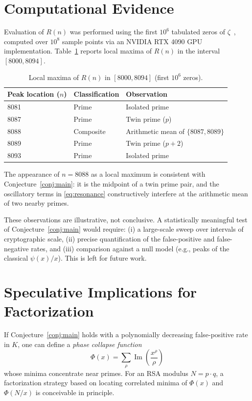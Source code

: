 \documentclass[11pt,a4paper]{article}
\begin{document}
\section{Computational Evidence}

Evaluation of $R(n)$ was performed using the first $10^6$ tabulated zeros of
$\zeta$~\cite{odlyzko}, computed over $10^8$ sample points via an NVIDIA RTX 4090
GPU implementation. Table~\ref{tab:results} reports local maxima of $R(n)$ in the
interval $[8000, 8094]$.

\begin{table}[h]
\centering
\caption{Local maxima of $R(n)$ in $[8000, 8094]$ (first $10^6$ zeros).}
\vspace{2mm}
\label{tab:results}
\begin{tabular}{lll}
\toprule
\textbf{Peak location ($n$)} & \textbf{Classification} & \textbf{Observation} \\
\midrule
8081 & Prime       & Isolated prime \\
8087 & Prime       & Twin prime ($p$) \\
8088 & Composite   & Arithmetic mean of $\{8087, 8089\}$ \\
8089 & Prime       & Twin prime ($p+2$) \\
8093 & Prime       & Isolated prime \\
\bottomrule
\end{tabular}
\end{table}

The appearance of $n=8088$ as a local maximum is consistent with
Conjecture~\ref{conj:main}: it is the midpoint of a twin prime pair, and the
oscillatory terms in \eqref{eq:resonance} constructively interfere at the
arithmetic mean of two nearby primes.

These observations are illustrative, not conclusive. A statistically meaningful
test of Conjecture~\ref{conj:main} would require:
(i) a large-scale sweep over intervals of cryptographic scale,
(ii) precise quantification of the false-positive and false-negative rates,
and (iii) comparison against a null model (e.g., peaks of the classical $\psi(x)/x$).
This is left for future work.

\section{Speculative Implications for Factorization}

If Conjecture~\ref{conj:main} holds with a polynomially decreasing false-positive
rate in $K$, one can define a \emph{phase collapse function}
\begin{equation}
  \Phi(x) = \sum_{\rho} \operatorname{Im}\!\left(\frac{x^{\rho}}{\rho}\right)
\end{equation}
whose minima concentrate near primes. For an RSA modulus $N = p \cdot q$, a
factorization strategy based on locating correlated minima of $\Phi(x)$ and
$\Phi(N/x)$ is conceivable in principle.
\end{document}

